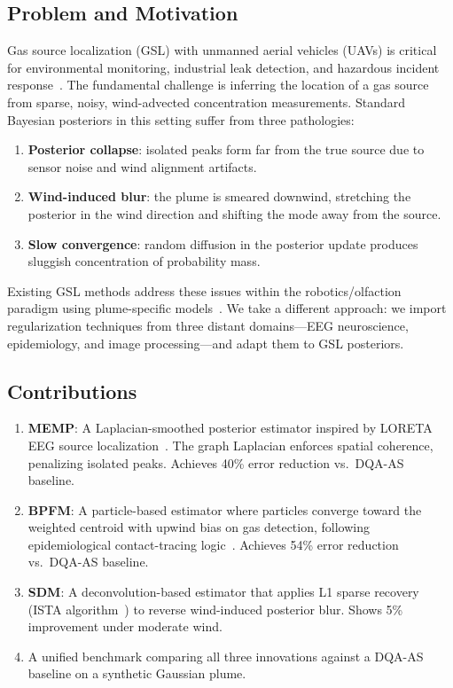 \documentclass[conference]{IEEEtran}
\begin{document}
\subsection{Problem and Motivation}
Gas source localization (GSL) with unmanned aerial vehicles (UAVs) is critical for environmental monitoring, industrial leak detection, and hazardous incident response~\cite{lilienthal2006methods}.
The fundamental challenge is inferring the location of a gas source from sparse, noisy, wind-advected concentration measurements.
Standard Bayesian posteriors in this setting suffer from three pathologies:
\begin{enumerate}
    \item \textbf{Posterior collapse}: isolated peaks form far from the true source due to sensor noise and wind alignment artifacts.
    \item \textbf{Wind-induced blur}: the plume is smeared downwind, stretching the posterior in the wind direction and shifting the mode away from the source.
    \item \textbf{Slow convergence}: random diffusion in the posterior update produces sluggish concentration of probability mass.
\end{enumerate}

Existing GSL methods address these issues within the robotics/olfaction paradigm using plume-specific models~\cite{vargas2016robot, loutfi2009using}.
We take a different approach: we import regularization techniques from three distant domains---EEG neuroscience, epidemiology, and image processing---and adapt them to GSL posteriors.

\subsection{Contributions}
\begin{enumerate}
    \item \textbf{MEMP}: A Laplacian-smoothed posterior estimator inspired by LORETA EEG source localization~\cite{pascual1994low}. The graph Laplacian enforces spatial coherence, penalizing isolated peaks. Achieves 40\% error reduction vs.\ DQA-AS baseline.
    \item \textbf{BPFM}: A particle-based estimator where particles converge toward the weighted centroid with upwind bias on gas detection, following epidemiological contact-tracing logic~\cite{wallinga2004different}. Achieves 54\% error reduction vs.\ DQA-AS baseline.
    \item \textbf{SDM}: A deconvolution-based estimator that applies L1 sparse recovery (ISTA algorithm~\cite{beck2009fast}) to reverse wind-induced posterior blur. Shows 5\% improvement under moderate wind.
    \item A unified benchmark comparing all three innovations against a DQA-AS baseline on a synthetic Gaussian plume.
\end{enumerate}
\end{document}
